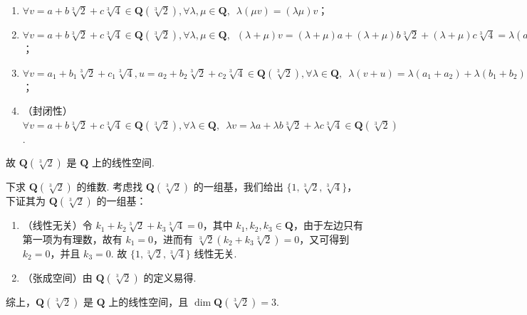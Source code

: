 \begin{exercise}
\begin{exgroup}
\begin{answer}
\begin{enumerate}
                \item $\forall v = a+b\sqrt[3]{2}+c\sqrt[3]{4} \in \mathbf{Q}(\sqrt[3]{2}), \forall \lambda, \mu \in \mathbf{Q}, \enspace \lambda(\mu v) = (\lambda \mu) v$；

                \item $\forall v = a+b\sqrt[3]{2}+c\sqrt[3]{4} \in \mathbf{Q}(\sqrt[3]{2}), \forall \lambda, \mu \in \mathbf{Q}, \enspace (\lambda + \mu) v = (\lambda + \mu)a + (\lambda + \mu) b\sqrt[3]{2} + (\lambda + \mu) c\sqrt[3]{4} = \lambda(a+b\sqrt[3]{2}+c\sqrt[3]{4}) + \mu(a+b\sqrt[3]{2}+c\sqrt[3]{4}) = \lambda v + \mu v$；

                \item $\forall v = a_1 + b_1\sqrt[3]{2} + c_1\sqrt[3]{4}, u = a_2 + b_2\sqrt[3]{2} + c_2\sqrt[3]{4} \in \mathbf{Q}(\sqrt[3]{2}), \forall \lambda \in \mathbf{Q}, \enspace \lambda(v+u) = \lambda (a_1 + a_2) + \lambda (b_1 + b_2)\sqrt[3]{2} + \lambda (c_1 + c_2)\sqrt[3]{4} = \lambda (a_1 + b_1\sqrt[3]{2} + c_1\sqrt[3]{4}) + \lambda (a_2 + b_2\sqrt[3]{2} + c_2\sqrt[3]{4}) = \lambda v + \lambda u$；

                \item （封闭性）$\forall v = a+b\sqrt[3]{2}+c\sqrt[3]{4} \in \mathbf{Q}(\sqrt[3]{2}), \forall \lambda \in \mathbf{Q}, \enspace \lambda v = \lambda a + \lambda b\sqrt[3]{2} + \lambda c\sqrt[3]{4} \in \mathbf{Q}(\sqrt[3]{2})$.
            \end{enumerate}
            故 $\mathbf{Q}(\sqrt[3]{2})$ 是 $\mathbf{Q}$ 上的线性空间.

            下求 $\mathbf{Q}(\sqrt[3]{2})$ 的维数. 考虑找 $\mathbf{Q}(\sqrt[3]{2})$ 的一组基，我们给出 $\{1, \sqrt[3]{2}, \sqrt[3]{4}\}$，下证其为 $\mathbf{Q}(\sqrt[3]{2})$ 的一组基：

            \begin{enumerate}
                \item （线性无关）令 $k_1 + k_2 \sqrt[3]{2} + k_3 \sqrt[3]{4} = 0$，其中 $k_1, k_2, k_3 \in \mathbf{Q}$，由于左边只有第一项为有理数，故有 $k_1 = 0$，进而有 $\sqrt[3]{2} (k_2 + k_3 \sqrt[3]{2}) = 0$，又可得到 $k_2 = 0$，并且 $k_3 = 0$. 故 $\{1, \sqrt[3]{2}, \sqrt[3]{4}\}$ 线性无关.

                \item （张成空间）由 $\mathbf{Q}(\sqrt[3]{2})$ 的定义易得.
            \end{enumerate}
            综上，$\mathbf{Q}(\sqrt[3]{2})$ 是 $\mathbf{Q}$ 上的线性空间，且 $\dim \mathbf{Q}(\sqrt[3]{2}) = 3$.


\end{answer}
\end{exgroup}
\end{exercise}

